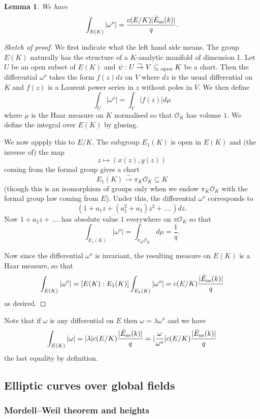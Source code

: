 \documentclass[12pt]{amsart}
\numberwithin{equation}{section}
\newtheorem{lemma}[equation]{Lemma}
\theoremstyle{remark}
\theoremstyle{definition}
\theoremstyle{definition}
\theoremstyle{definition}
\theoremstyle{definition}
\theoremstyle{definition}
\theoremstyle{definition}
\theoremstyle{definition}
\begin{document}
\begin{lemma} \label{local period lemma}
We have
\[\int_{E(K)}|\omega^o|=\frac{c(E/K)|\tilde{E}_{\textup{ns}}(k)|}{q}.\]
\end{lemma}

\begin{proof}[Sketch of proof]
We first indicate what the left hand side means. The group $E(K)$ naturally has the structure of a $K$-analytic manifold of dimension 1. Let $U$ be an open subset of $E(K)$ and $\psi:U\stackrel{\sim}{\rightarrow}V\subseteq_{\textup{ open}}K$ be a chart. Then the differential $\omega^o$ takes the form $f(z)dz$ on $V$ where $dz$ is the usual differential on $K$ and $f(z)$ is a Laurent power series in $z$ without poles in $V$. We then define
\[\int_{U}|\omega^o|=\int_{V}|f(z)|d\mu\]
where $\mu$ is the Haar measure on $K$ normalised so that $\mathcal{O}_K$ has volume $1$. We define the integral over $E(K)$ by glueing. 

We now appply this to $E/K$. The subgroup $E_1(K)$ is open in $E(K)$ and (the inverse of) the map 
\[z\mapsto (x(z),y(z))\]
coming from the formal group gives a chart 
\[E_1(K)\stackrel{\sim}{\longrightarrow}\pi_K\mathcal{O}_K\subseteq K\]
(though this is an isomorphism of groups only when we endow $\pi_K\mathcal{O}_K$ with the formal group law coming from $E$). Under this, the differential $\omega^o$ corresponds to 
\[(1+a_1z+(a_1^2+a_2)z^2+....)dz.\]
Now $1+a_1z+....$ has absolute value $1$ everywhere on $\pi\mathcal{O}_K$ so that
\[\int_{E_1(K)}|\omega^o|=\int_{\pi_K\mathcal{O}_K}d\mu=\frac{1}{q}.\]


Now since the differential $\omega^o$ is invariant, the resulting measure on $E(K)$ is a Haar measure, so that 
\[\int_{E(K)}|\omega^o|=[E(K):E_1(K)]\int_{E_1(K)}|\omega^o|=c(E/K)\frac{|\tilde{E}_{\textup{ns}}(k)|}{q}\]
as desired.
\end{proof}

Note that if $\omega$ is any differential on $E$ then $\omega=\lambda\omega^o$ and we have
\[\int_{E(K)}|\omega|=|\lambda|c(E/K)\frac{|\tilde{E}_{\textup{ns}}(k)|}{q}=|\frac{\omega}{\omega^o}|c(E/K)\frac{|\tilde{E}_{\textup{ns}}(k)|}{q}\]
the last equality by definition.

\subsection{Elliptic curves over global fields}

\subsubsection{Mordell--Weil theorem and heights}
\end{document}
